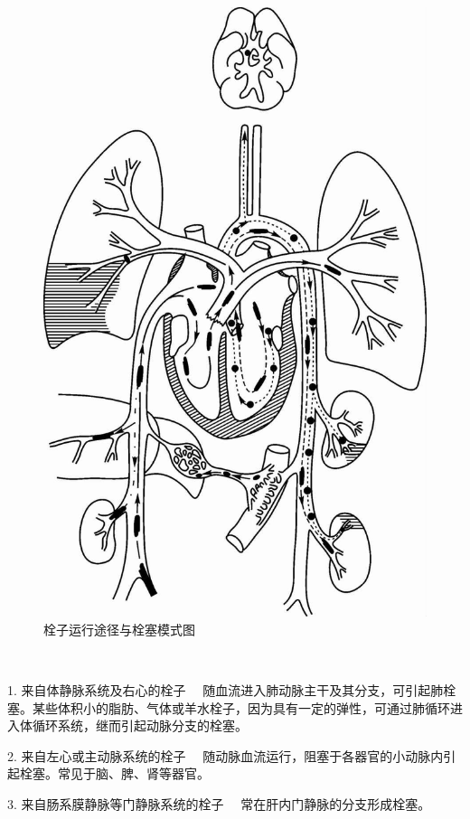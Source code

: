 \begin{figure}[!htbp]
\centering
\includegraphics{./images/Image00043.jpg}
\caption{栓子运行途径与栓塞模式图}
\label{fig3-9} 
\end{figure} 　

{1. 来自体静脉系统及右心的栓子}
　随血流进入肺动脉主干及其分支，可引起肺栓塞。某些体积小的脂肪、气体或羊水栓子，因为具有一定的弹性，可通过肺循环进入体循环系统，继而引起动脉分支的栓塞。

{2. 来自左心或主动脉系统的栓子}
　随动脉血流运行，阻塞于各器官的小动脉内引起栓塞。常见于脑、脾、肾等器官。

{3. 来自肠系膜静脉等门静脉系统的栓子} 　常在肝内门静脉的分支形成栓塞。

